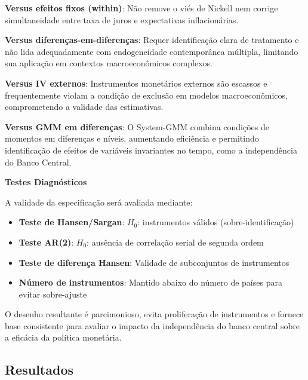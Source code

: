 \documentclass[a4paper,12pt]{article}
\begin{document}
\textbf{Versus efeitos fixos (within)}: Não remove o viés de Nickell nem corrige simultaneidade entre taxa de juros e expectativas inflacionárias.

\textbf{Versus diferenças-em-diferenças}: Requer identificação clara de tratamento e não lida adequadamente com endogeneidade contemporânea múltipla, limitando sua aplicação em contextos macroeconômicos complexos.

\textbf{Versus IV externos}: Instrumentos monetários externos são escassos e frequentemente violam a condição de exclusão em modelos macroeconômicos, comprometendo a validade das estimativas.

\textbf{Versus GMM em diferenças}: O System-GMM combina condições de momentos em diferenças e níveis, aumentando eficiência e permitindo identificação de efeitos de variáveis invariantes no tempo, como a independência do Banco Central.

\textbf{Testes Diagnósticos}

A validade da especificação será avaliada mediante:

\begin{itemize}
    \item \textbf{Teste de Hansen/Sargan}: $H_0$: instrumentos válidos (sobre-identificação)
    \item \textbf{Teste AR(2)}: $H_0$: ausência de correlação serial de segunda ordem
    \item \textbf{Teste de diferença Hansen}: Validade de subconjuntos de instrumentos
    \item \textbf{Número de instrumentos}: Mantido abaixo do número de países para evitar sobre-ajuste
\end{itemize}

O desenho resultante é parcimonioso, evita proliferação de instrumentos e fornece base consistente para avaliar o impacto da independência do banco central sobre a eficácia da política monetária.

\subsection*{\textbf{Resultados}}
\end{document}
